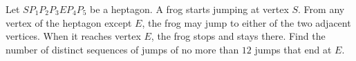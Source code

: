 Let $SP_1P_2P_3EP_4P_5$ be a heptagon. A frog starts jumping at vertex $S$. From any vertex of the heptagon except $E$,  the frog may jump to either of the two adjacent vertices. When it reaches vertex $E$,  the frog stops and stays there. Find the number of distinct sequences of jumps of no more than $12$ jumps that end at $E$.